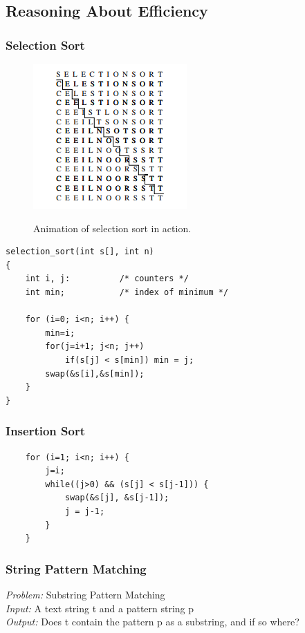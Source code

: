 \subsection{Reasoning About Efficiency}

\subsubsection{Selection Sort}

\begin{figure}[H]
  \centering
     \includegraphics[scale=0.9]{./2_5.png}
  \label{fig:demo-diagram2-5}
  \caption{Animation of selection sort in action.}
\end{figure}

\begin{verbatim}
selection_sort(int s[], int n)
{
    int i, j:          /* counters */
    int min;           /* index of minimum */

    for (i=0; i<n; i++) {
        min=i;
        for(j=i+1; j<n; j++)
            if(s[j] < s[min]) min = j;
        swap(&s[i],&s[min]);
    }
}
\end{verbatim}


\subsubsection{Insertion Sort}

\begin{verbatim}
    for (i=1; i<n; i++) {
        j=i;
        while((j>0) && (s[j] < s[j-1])) {
            swap(&s[j], &s[j-1]);
            j = j-1;
        }
    }
\end{verbatim}


\subsubsection{String Pattern Matching}
\emph{Problem:} Substring Pattern Matching\\
\emph{Input:} A text string t and a pattern string p\\
\emph{Output:} Does t contain the pattern p as a substring, and if so where?\\

